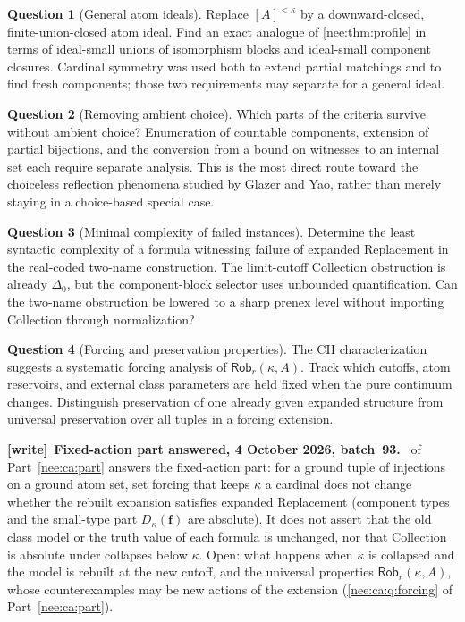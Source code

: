 \documentclass[11pt,letterpaper]{article}
\numberwithin{equation}{section}
\theoremstyle{plain}
\theoremstyle{definition}
\newtheorem{question}[question]{Question}
\theoremstyle{remark}
\newenvironment{writenote}[1][]{\par\smallskip\begingroup\small\raggedright
 \setlength{\parindent}{1.25em}\noindent\textbf{[write]}\if\relax\detokenize{#1}\relax\else~\textbf{#1.}\fi\ }%
 {\par\endgroup\smallskip}
\begin{document}
\begin{question}[General atom ideals]
Replace $[A]^{<\kappa}$ by a downward-closed, finite-union-closed atom ideal. Find an exact analogue of \cref{nee:thm:profile} in terms of ideal-small unions of isomorphism blocks and ideal-small component closures. Cardinal symmetry was used both to extend partial matchings and to find fresh components; those two requirements may separate for a general ideal.
\end{question}

\begin{question}[Removing ambient choice]
Which parts of the criteria survive without ambient choice? Enumeration of countable components, extension of partial bijections, and the conversion from a bound on witnesses to an internal set each require separate analysis. This is the most direct route toward the choiceless reflection phenomena studied by Glazer and Yao, rather than merely staying in a choice-based special case.
\end{question}

\begin{question}[Minimal complexity of failed instances]
Determine the least syntactic complexity of a formula witnessing failure of expanded Replacement in the real-coded two-name construction. The limit-cutoff Collection obstruction is already $\Delta_0$, but the component-block selector uses unbounded quantification. Can the two-name obstruction be lowered to a sharp prenex level without importing Collection through normalization?
\end{question}

\begin{question}[Forcing and preservation properties]\label{nee:q:forcing}
The CH characterization suggests a systematic forcing analysis of $\mathsf{Rob}_r(\kappa,A)$. Track which cutoffs, atom reservoirs, and external class parameters are held fixed when the pure continuum changes. Distinguish preservation of one already given expanded structure from universal preservation over all tuples in a forcing extension.
\end{question}

\begin{writenote}[Fixed-action part answered, 4 October 2026, batch~93]
 of Part~\ref{nee:ca:part} answers the fixed-action part: for a ground tuple of injections on a ground atom set, set forcing that keeps $\kappa$ a cardinal does not change whether the rebuilt expansion satisfies expanded Replacement (component types and the small-type part $D_\kappa(\boldsymbol f)$ are absolute). It does not assert that the old class model or the truth value of each formula is unchanged, nor that Collection is absolute under collapses below $\kappa$. Open: what happens when $\kappa$ is collapsed and the model is rebuilt at the new cutoff, and the universal properties $\mathsf{Rob}_r(\kappa,A)$, whose counterexamples may be new actions of the extension (\cref{nee:ca:q:forcing} of Part~\ref{nee:ca:part}).
\end{writenote}
\end{document}
